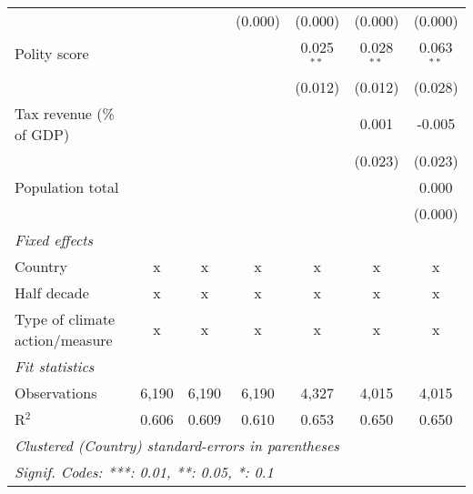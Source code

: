 \begin{tabular}{lcccccc}
                                                                                       &                &               & (0.000)        & (0.000)        & (0.000)        & (0.000)\\   
   Polity score                                                                        &                &               &                & 0.025$^{**}$   & 0.028$^{**}$   & 0.063$^{**}$\\   
                                                                                       &                &               &                & (0.012)        & (0.012)        & (0.028)\\   
   Tax revenue (\% of GDP)                                                             &                &               &                &                & 0.001          & -0.005\\   
                                                                                       &                &               &                &                & (0.023)        & (0.023)\\   
   Population total                                                                    &                &               &                &                &                & 0.000\\   
                                                                                       &                &               &                &                &                & (0.000)\\   
   \emph{Fixed effects}\\
   Country                                                                             & x              & x             & x              & x              & x              & x\\  
   Half decade                                                                         & x              & x             & x              & x              & x              & x\\  
   Type of climate action/measure                                                      & x              & x             & x              & x              & x              & x\\  
   \midrule \emph{Fit statistics}\\
   Observations                                                                        & 6,190          & 6,190         & 6,190          & 4,327          & 4,015          & 4,015\\  
   R$^2$                                                                               & 0.606          & 0.609         & 0.610          & 0.653          & 0.650          & 0.650\\  
   \midrule
   \multicolumn{7}{l}{\emph{Clustered (Country) standard-errors in parentheses}}\\
   \multicolumn{7}{l}{\emph{Signif. Codes: ***: 0.01, **: 0.05, *: 0.1}}\\
\end{tabular}
\par\endgroup


